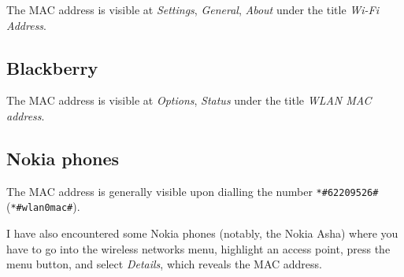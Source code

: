 \documentclass[12pt]{article}
\begin{document}
The MAC address is visible at \emph{Settings}, \emph{General}, \emph{About}
under the title \emph{Wi-Fi Address}.

\subsection{Blackberry}

The MAC address is visible at \emph{Options}, \emph{Status} under the title
\emph{WLAN MAC address}.

\subsection{Nokia phones}

The MAC address is generally visible upon dialling the number
\texttt{*\#62209526\#} (\texttt{*\#wlan0mac\#}).

I have also encountered some Nokia phones (notably, the Nokia Asha) where you
have to go into the wireless networks menu, highlight an access point, press
the menu button, and select \emph{Details}, which reveals the MAC address.
\end{document}
